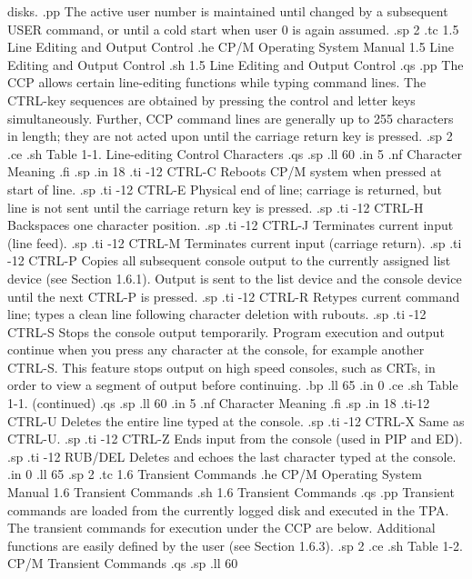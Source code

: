 disks.
.pp
The active user number is maintained until changed by a subsequent USER
command, or until a cold start when user 0 is again assumed.
.sp 2
.tc    1.5  Line Editing and Output Control
.he CP/M Operating System Manual 1.5  Line Editing and Output Control
.sh
1.5  Line Editing and Output Control
.qs
.pp
The CCP allows certain line-editing functions while typing command lines.
The CTRL-key sequences are obtained by pressing the control and letter keys
simultaneously.  Further, CCP command lines are generally up to 255
characters in length; they are not acted upon until the carriage return key
is pressed.
.sp 2
.ce
.sh
Table 1-1.  Line-editing Control Characters
.qs
.sp
.ll 60
.in 5
.nf
Character                      Meaning
.fi
.sp
.in 18
.ti -12
CTRL-C      Reboots CP/M system when pressed at start of line.
.sp
.ti -12
CTRL-E      Physical end of line; carriage is returned, but line is not sent
until the carriage return key is pressed.
.sp
.ti -12
CTRL-H      Backspaces one character position.
.sp
.ti -12
CTRL-J      Terminates current input (line feed).
.sp
.ti -12
CTRL-M      Terminates current input (carriage return).
.sp
.ti -12
CTRL-P      Copies all subsequent console output to the currently
assigned list device (see Section 1.6.1).  Output is sent to the list device
and the console device until the next CTRL-P is pressed.
.sp
.ti -12
CTRL-R      Retypes current command line; types a clean line following
character deletion with rubouts.
.sp
.ti -12
CTRL-S      Stops the console output temporarily.  Program execution and
output continue when you press any character at the console, for 
example another CTRL-S.  This feature stops output on high speed consoles,
such as CRTs, in order to view a segment of output before continuing.
.bp
.ll 65
.in 0
.ce
.sh
Table 1-1.  (continued)
.qs
.sp
.ll 60
.in 5
.nf
Character                      Meaning
.fi
.sp
.in 18
.ti-12
CTRL-U      Deletes the entire line typed at the console.
.sp
.ti -12
CTRL-X      Same as CTRL-U.
.sp
.ti -12
CTRL-Z      Ends input from the console (used in PIP and ED).
.sp
.ti -12
RUB/DEL     Deletes and echoes the last character typed at the console.
.in 0
.ll 65
.sp 2
.tc    1.6  Transient Commands
.he CP/M Operating System Manual              1.6  Transient Commands
.sh
1.6  Transient Commands
.qs
.pp
Transient commands are loaded from the currently logged disk and executed in
the TPA.  The transient commands for execution under the CCP are below.
Additional functions are easily defined by the user (see Section 1.6.3).
.sp 2
.ce
.sh
Table 1-2.  CP/M Transient Commands
.qs
.sp
.ll 60
